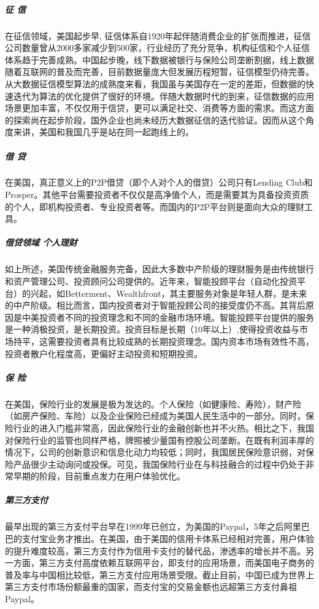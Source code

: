 \documentclass[letterpaper,10pt,english]{sphinxmanual}
\begin{document}
\subparagraph{征 信}
\label{\detokenize{chapter_AI+Finance/FinTech:id17}}
在征信领域，美国起步早,
征信体系自1920年起伴随消费企业的扩张而推进，征信公司数量曾从2000多家减少到500家，行业经历了充分竞争，机构征信和个人征信体系趋于完善成熟。中国起步晚，线下数据被银行与保险公司垄断割据，线上数据随着互联网的普及而完善，目前数据量庞大但发展历程短暂，征信模型仍待完善。从大数据征信模型算法的成熟度来看，我国虽与美国存在一定的差距，但数据的快速迭代为算法的优化提供了很好的环境。伴随大数据时代的到来，征信数据的应用场景更加丰富，不仅仅用于信贷，更可以满足社交、消费等方面的需求。而这方面的探索尚在起步阶段，国外企业也尚未经历大数据征信的迭代验证。因而从这个角度来讲，美国和我国几乎是站在同一起跑线上的。


\subparagraph{借 贷}
\label{\detokenize{chapter_AI+Finance/FinTech:id18}}
在美国，真正意义上的P2P借贷（即个人对个人的借贷）公司只有Lending
Club和Prosper。其他平台需要投资者不仅仅是高净值个人，而是需要其为具备投资资质的个人，即机构投资者、专业投资者等。而国内的P2P平台则是面向大众的理财工具。


\subparagraph{借贷领域 个人理财}
\label{\detokenize{chapter_AI+Finance/FinTech:id19}}
如上所述，美国传统金融服务完备，因此大多数中产阶级的理财服务是由传统银行和资产管理公司、投资顾问公司提供的。近年来，智能投顾平台（自动化投资平台）的兴起，如Betterment、Wealthfront，其主要服务对象是年轻人群，是未来的中产阶级。相比而言，国内投资者对于智能投顾公司的接受度仍不高。其背后原因是中美投资者不同的投资理念和不同的金融市场环境。智能投顾平台提供的服务是一种消极投资，是长期投资。投资目标是长期（10年以上）,使得投资收益与市场持平，这需要投资者具有比较成熟的长期投资理念。国内资本市场有效性不高，投资者散户化程度高，更偏好主动投资和短期投资。


\subparagraph{保 险}
\label{\detokenize{chapter_AI+Finance/FinTech:id20}}
在美国，保险行业的发展是极为发达的。个人保险（如健康险、寿险），财产险（如房产保险、车险）以及企业保险已经成为美国人民生活中的一部分。同时，保险行业的进入门槛非常高，因此保险行业的金融创新也并不火热。相比之下，我国对保险行业的监管也同样严格，牌照被少量国有控股公司垄断。在既有利润丰厚的情况下，公司的创新意识和信息化动力均较低；同时，我国居民保险意识弱，对保险产品很少主动询问或投保。可见，我国保险行业在与科技融合的过程中仍处于非常早期的阶段，目前重点发力在用户体验优化。


\subparagraph{第三方支付}
\label{\detokenize{chapter_AI+Finance/FinTech:id21}}
最早出现的第三方支付平台早在1999年已创立，为美国的Paypal，5年之后阿里巴巴的支付宝业务才推出。在美国，由于美国的信用卡体系已经相对完善，用户体验的提升难度较高，第三方支付作为信用卡支付的替代品，渗透率的增长并不高。另一方面，第三方支付高度依赖互联网平台，即支付的应用场景，而美国电子商务的普及率与中国相比较低，第三方支付应用场景受限。截止目前，中国已成为世界上第三方支付市场份额最重的国家，而支付宝的交易金额也远超第三方支付鼻祖Paypal。
\end{document}
